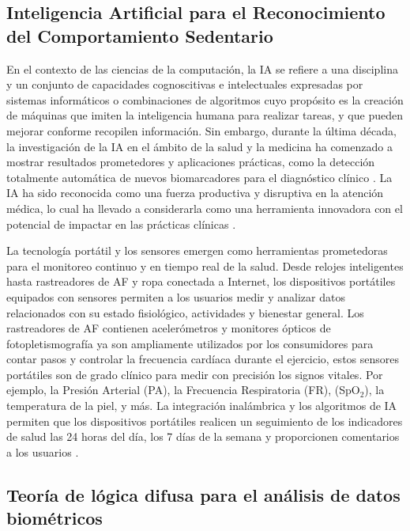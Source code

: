 \subsection{Inteligencia Artificial para el Reconocimiento del Comportamiento Sedentario}
\label{subsec:ia_reconocimiento_cs}

En el contexto de las ciencias de la computación, la IA se refiere a una disciplina y un conjunto de capacidades cognoscitivas e intelectuales expresadas por sistemas informáticos o combinaciones de algoritmos cuyo propósito es la creación de máquinas que imiten la inteligencia humana para realizar tareas, y que pueden mejorar conforme recopilen información. Sin embargo, durante la última década, la investigación de la IA en el ámbito de la salud y la medicina ha comenzado a mostrar resultados prometedores y aplicaciones prácticas, como la detección totalmente automática de nuevos biomarcadores para el diagnóstico clínico \citep{Farrahi2024MachineLearning}. La IA ha sido reconocida como una fuerza productiva y disruptiva en la atención médica, lo cual ha llevado a considerarla como una herramienta innovadora con el potencial de impactar en las prácticas clínicas \citep{Santos2021Perceptions,SyedAbdul2020DataAnalytics}.

La tecnología portátil y los sensores emergen como herramientas prometedoras para el monitoreo continuo y en tiempo real de la salud. Desde relojes inteligentes hasta rastreadores de AF y ropa conectada a Internet, los dispositivos portátiles equipados con sensores permiten a los usuarios medir y analizar datos relacionados con su estado fisiológico, actividades y bienestar general. Los rastreadores de AF contienen acelerómetros y monitores ópticos de fotopletismografía ya son ampliamente utilizados por los consumidores para contar pasos y controlar la frecuencia cardíaca durante el ejercicio, estos sensores portátiles son de grado clínico para medir con precisión los signos vitales. Por ejemplo, la Presión Arterial (PA), la Frecuencia Respiratoria (FR), (SpO$_2$), la temperatura de la piel, y más. La integración inalámbrica y los algoritmos de IA permiten que los dispositivos portátiles realicen un seguimiento de los indicadores de salud las 24 horas del día, los 7 días de la semana y proporcionen comentarios a los usuarios \citep{Khan2024Wearable}.

\subsection{Teoría de lógica difusa para el análisis de datos biométricos}
\label{subsec:teoria_logica_difusa}

